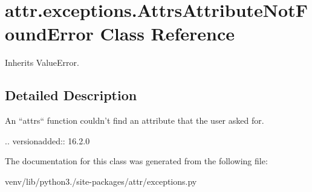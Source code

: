 \hypertarget{classattr_1_1exceptions_1_1_attrs_attribute_not_found_error}{}\section{attr.\+exceptions.\+Attrs\+Attribute\+Not\+Found\+Error Class Reference}
\label{classattr_1_1exceptions_1_1_attrs_attribute_not_found_error}


Inherits Value\+Error.



\subsection{Detailed Description}
\begin{DoxyVerb}An ``attrs`` function couldn't find an attribute that the user asked for.

.. versionadded:: 16.2.0
\end{DoxyVerb}
 

The documentation for this class was generated from the following file\+:\begin{DoxyCompactItemize}
\item 
venv/lib/python3./site-\/packages/attr/exceptions.\+py\end{DoxyCompactItemize}
